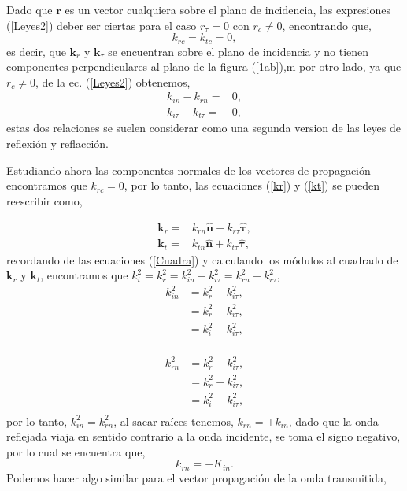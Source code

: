 \documentclass[11pt,fleqn]{book} %
\begin{document}
 \begin{obs}
Dado que $\textbf{r}$ es un vector cualquiera sobre el plano de incidencia, las expresiones (\ref{Leyes2}) deber ser ciertas para el caso $r_{\tau}=0$ con $r_c\neq0$, encontrando que,
\begin{equation}
k_{rc}=k_{tc}=0,
\end{equation}
es decir, que $\textbf{k}_r$ y $\textbf{k}_{\tau}$ se encuentran sobre el plano de incidencia y no tienen componentes perpendiculares al plano de la figura (\ref{1ab}),m por otro lado, ya que $r_c\neq0$, de la ec. (\ref{Leyes2}) obtenemos,
 \begin{equation}
 \begin{split}
k_{in}-k_{rn}=&0,\\
k_{i\tau}-k_{t\tau}=&0,
\end{split}
 \end{equation}
estas dos relaciones se suelen considerar como una segunda version de las leyes de reflexi\'on y reflacci\'on.
\end{obs}
Estudiando ahora las componentes normales de los vectores de propagaci\'on encontramos que $k_{rc}=0$, por lo tanto, las ecuaciones (\ref{kr}) y (\ref{kt}) se pueden reescribir como,

\begin{equation*}
\begin{split}
\textbf{k}_r=&k_{rn}\hat{\textbf{n}}+k_{r\tau}\hat{\mathbf{\tau}},\\
\textbf{k}_t=&k_{tn}\hat{\textbf{n}}+k_{t\tau}\hat{\mathbf{\tau}},
\end{split}
\end{equation*}
recordando de las ecuaciones (\ref{Cuadra}) y calculando los m\'odulos al cuadrado de $\textbf{k}_r$ y $\textbf{k}_t$, encontramos que $k_i^2=k_r^2=k_{in}^2+k_{i\tau}^2=k_{rn}^2+k_{r\tau}^2$,
\begin{equation*}
\begin{split}
k_{in}^2&=k_r^2-k_{i\tau}^2,\\
&=k_r^2-k_{i\tau}^2,\\
&=k_i^2-k_{i\tau}^2,\\
\end{split}
\end{equation*}

\begin{equation*}
\begin{split}
k_{rn}^2&=k_r^2-k_{i\tau}^2,\\
&=k_r^2-k_{i\tau}^2,\\
&=k_i^2-k_{i\tau}^2,\\
\end{split}
\end{equation*}
por lo tanto, $k_{in}^2=k_{rn}^2$, al sacar ra\'ices tenemos, $k_{rn}=\pm k_{in}$, dado que la onda reflejada viaja en sentido contrario a la onda incidente, se toma el signo negativo, por lo cual se encuentra que,
\begin{equation}
k_{rn}=-K_{in}. \label{Refle}
\end{equation}
Podemos hacer algo similar para el vector propagaci\'on de la onda transmitida,
\end{document}
